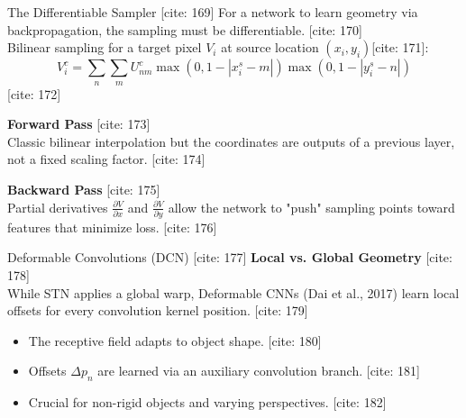 \documentclass[aspectratio=169,10pt]{beamer}
\begin{document}
\begin{frame}{The Differentiable Sampler [cite: 169]}
    For a network to learn geometry via backpropagation, the sampling must be differentiable. [cite: 170]\\
    \vspace{0.5em}
    Bilinear sampling for a target pixel $V_i$ at source location $(x_i,y_i)$[cite: 171]:
    $$V_{i}^{c}=\sum_{n}\sum_{m}U_{nm}^{c}\max(0,1-|x_{i}^{s}-m|)\max(0,1-|y_{i}^{s}-n|)$$ [cite: 172]
    
    \textbf{Forward Pass} [cite: 173]\\
    Classic bilinear interpolation but the coordinates are outputs of a previous layer, not a fixed scaling factor. [cite: 174]\\
    \vspace{0.5em}

    \textbf{Backward Pass} [cite: 175]\\
    Partial derivatives $\frac{\partial V}{\partial x}$ and $\frac{\partial V}{\partial y}$ allow the network to "push" sampling points toward features that minimize loss. [cite: 176]
\end{frame}

\begin{frame}{Deformable Convolutions (DCN) [cite: 177]}
    \textbf{Local vs. Global Geometry} [cite: 178]\\
    While STN applies a global warp, Deformable CNNs (Dai et al., 2017) learn local offsets for every convolution kernel position. [cite: 179]
    
    \vspace{0.5em}
    \begin{itemize}
        \item The receptive field adapts to object shape. [cite: 180]
        \item Offsets $\Delta p_n$ are learned via an auxiliary convolution branch. [cite: 181]
        \item Crucial for non-rigid objects and varying perspectives. [cite: 182]
    \end{itemize}
\end{frame}
\end{document}
